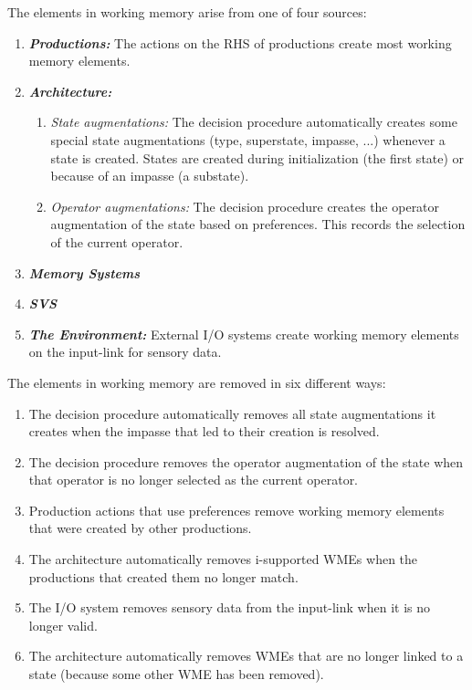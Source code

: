 The elements in working memory arise from one of four sources:\vspace{-12pt}
\begin{enumerate}
\item \textbf{\textit{Productions:}} The actions on the RHS of productions create most working memory elements.
\vspace{-8pt}
\item \textbf{\textit{Architecture:}} \vspace{-8pt}
\begin{enumerate}
	\item \textit{State augmentations:} The decision procedure automatically creates some special 
   state augmentations (type, superstate, impasse, ...)
	whenever a state is created.  States are created during 
	initialization (the first state) or because of an impasse (a substate).  \vspace{-4pt}
\item \textit{Operator augmentations:}  The decision procedure creates the operator augmentation of the state 
based on
preferences.  This records the selection of the current operator.\vspace{-8pt}
\end{enumerate}
\item \textbf{\textit{Memory Systems}} \vspace{-8pt}
\item \textbf{\textit{SVS}} \vspace{-8pt}
\item \textbf{\textit{The Environment:}} External I/O systems create working memory elements on the input-link
for sensory data.
\end{enumerate}

The elements in working memory are removed in six different ways:\vspace{-12pt}
\begin{enumerate}
\item The decision procedure automatically removes all state
augmentations it creates when the impasse that led to their creation is 
resolved.\vspace{-8pt}
\item The decision procedure removes the operator augmentation of the
state when that operator is no longer selected as the current operator.\vspace{-
8pt}
\item Production actions that use  preferences remove
      working memory elements that were created by other productions.\vspace{-8pt}
\item The architecture automatically removes i-supported WMEs when the productions that created them no longer match.\vspace{-8pt}
\item The I/O system removes sensory data from the input-link when it
is no longer valid. \vspace{-8pt}
\item The architecture automatically removes WMEs that are no longer linked to 
a state (because some other WME has been removed).
\end{enumerate}


